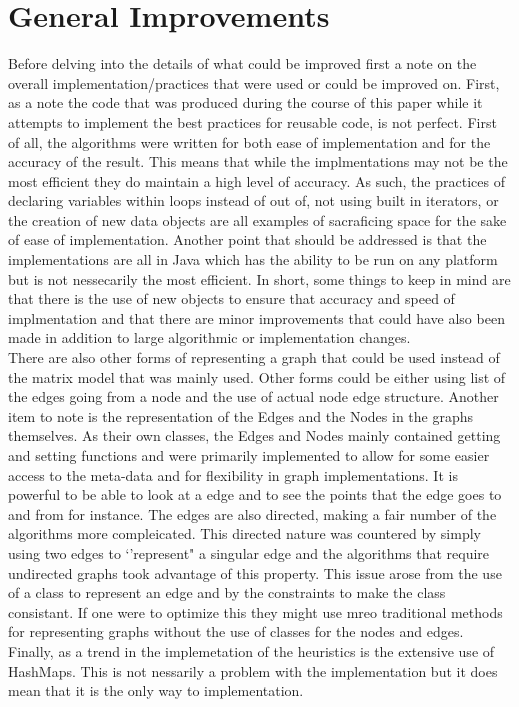 \documentclass[midd]{thesis}
\newcommand{\tab}{\hspace*{2em}}
\begin{document}
\section{General Improvements}
\tab Before delving into the details of what could be improved first a note on the overall implementation/practices that were used or could be improved on. First, as a note the code that was produced during the course of this paper while it attempts to implement the best practices for reusable code, is not perfect. First of all, the algorithms were written for both ease of implementation and for the accuracy of the result. This means that while the implmentations may not be the most efficient they do maintain a high level of accuracy. As such, the practices of declaring variables within loops instead of out of, not using built in iterators, or the creation of new data objects are all examples of sacraficing space for the sake of ease of implementation. Another point that should be addressed is that the implementations are all in Java which has the ability to be run on any platform but is not nessecarily the most efficient. In short, some things to keep in mind are that there is the use of new objects to ensure that accuracy and speed of implmentation and that there are minor improvements that could have also been made in addition to large algorithmic or implementation changes.\\
\tab There are also other forms of representing a graph that could be used instead of the matrix model that was mainly used. Other forms could be either using list of the edges going from a node and the use of actual node edge structure. Another item to note is the representation of the Edges and the Nodes in the graphs themselves. As their own classes, the Edges and Nodes mainly contained getting and setting functions and were primarily implemented to allow for some easier access to the meta-data and for flexibility in graph implementations. It is powerful to be able to look at a edge and to see the points that the edge goes to and from for instance. The edges are also directed, making a fair number of the algorithms more compleicated. This directed nature was countered by simply using two edges to `'represent" a singular edge and the algorithms that require undirected graphs took advantage of this property. This issue arose from the use of a class to represent an edge and by the constraints to make the class consistant. If one were to optimize this they might use mreo traditional methods for representing graphs without the use of classes for the nodes and edges. Finally, as a trend in the implemetation of the heuristics is the extensive use of HashMaps. This is not nessarily a problem with the implementation but it does mean that it is the only way to implementation.\\
\end{document}
